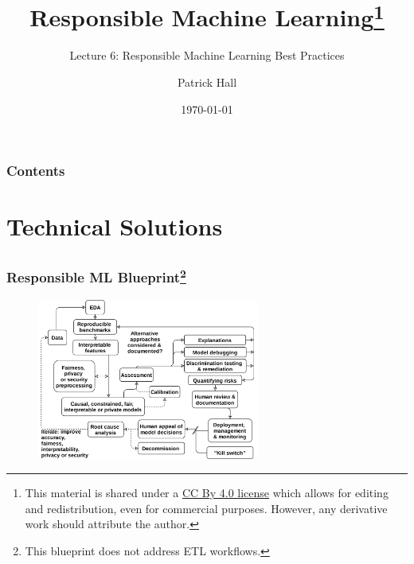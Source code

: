 \documentclass[11pt,
               aspectratio=169,
               hyperref={colorlinks}
               ]{beamer}
\author{Patrick Hall}
\title{Responsible Machine Learning\footnote{\tiny{This material is shared under a \href{https://creativecommons.org/licenses/by/4.0/deed.ast}{CC By 4.0 license} which allows for editing and redistribution, even for commercial purposes. However, any derivative work should attribute the author.}}}
\subtitle{Lecture 6: Responsible Machine Learning Best Practices}
\institute{The George Washington University}
\date{\today}
\begin{document}
	
	\maketitle
	
	\begin{frame}
	
		\frametitle{Contents}
		
		\tableofcontents{}
		
	\end{frame}

	\section{Technical Solutions}

		\subsection*{}
		
			\begin{frame}				
				\frametitle{Responsible ML Blueprint\footnote{\tiny{This blueprint does not address ETL workflows.}}}
								
				\begin{figure}[htb]
					\begin{center}
						\includegraphics[height=150pt]{../img/rml_diagram_no_hilite.png}
						\label{fig:blueprint}
					\end{center}
				\end{figure}		
			
			\end{frame}
		
\end{document}
